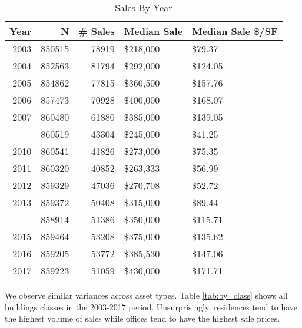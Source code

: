 \documentclass[12pt,]{article}
\begin{document}
\begin{table}

\caption{\label{tab:by_year}\label{tab:by_year} Sales By Year}
\centering
\begin{tabular}[t]{rrrll}
\toprule
Year & N & \# Sales & Median Sale & Median Sale \$/SF\\
\midrule
2003 & 850515 & 78919 & \$218,000 & \$79.37\\
2004 & 852563 & 81794 & \$292,000 & \$124.05\\
2005 & 854862 & 77815 & \$360,500 & \$157.76\\
2006 & 857473 & 70928 & \$400,000 & \$168.07\\
2007 & 860480 & 61880 & \$385,000 & \$139.05\\
\addlinespace
2009 & 860519 & 43304 & \$245,000 & \$41.25\\
2010 & 860541 & 41826 & \$273,000 & \$75.35\\
2011 & 860320 & 40852 & \$263,333 & \$56.99\\
2012 & 859329 & 47036 & \$270,708 & \$52.72\\
2013 & 859372 & 50408 & \$315,000 & \$89.44\\
\addlinespace
2014 & 858914 & 51386 & \$350,000 & \$115.71\\
2015 & 859464 & 53208 & \$375,000 & \$135.62\\
2016 & 859205 & 53772 & \$385,530 & \$147.06\\
2017 & 859223 & 51059 & \$430,000 & \$171.71\\
\bottomrule
\end{tabular}
\end{table}

We observe similar variances across asset types. Table
\ref{tab:by_class} shows all buildings classes in the 2003-2017 period.
Unsurprisingly, residences tend to have the highest volume of sales
while offices tend to have the highest sale prices.
\end{document}
